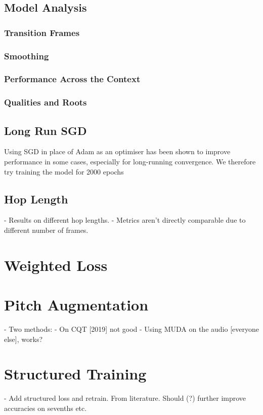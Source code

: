 \subsection{Model Analysis}
\subsubsection{Transition Frames}
\subsubsection{Smoothing}
\subsubsection{Performance Across the Context}
\subsubsection{Qualities and Roots}

\subsection{Long Run SGD}

Using SGD in place of Adam as an optimiser has been shown to improve performance in some cases, especially for long-running convergence. We therefore try training the model for 2000 epochs

\subsection{Hop Length}
- Results on different hop lengths.
- Metrics aren't directly comparable due to different number of frames.

\section{Weighted Loss}

\section{Pitch Augmentation}
- Two methods:
- On CQT [2019] not good
- Using MUDA on the audio [everyone else], works?

\section{Structured Training}

- Add structured loss and retrain. From literature. Should (?) further improve accuracies on sevenths etc.

